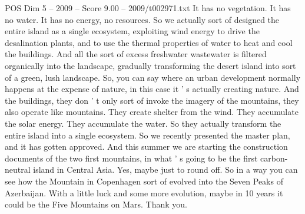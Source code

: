 \begin{textsample}{POS Dim 5 – 2009 – Score 9.00 – 2009/t002971.txt}
It has no vegetation.
It has no water.
It has no energy, no resources.
So we actually sort of designed the entire island as a single ecosystem, exploiting wind energy to drive the desalination plants, and to use the thermal properties of water to heat and cool the buildings.
And all the sort of excess freshwater wastewater is filtered organically into the landscape, gradually transforming the desert island into sort of a green, lush landscape.
So, you can say where an urban development normally happens at the expense of nature, in this case it ' s actually creating nature.
And the buildings, they don ' t only sort of invoke the imagery of the mountains, they also operate like mountains.
They create shelter from the wind.
They accumulate the solar energy.
They accumulate the water.
So they actually transform the entire island into a single ecosystem.
So we recently presented the master plan, and it has gotten approved.
And this summer we are starting the construction documents of the two first mountains, in what ' s going to be the first carbon-neutral island in Central Asia.
Yes, maybe just to round off.
So in a way you can see how the Mountain in Copenhagen sort of evolved into the Seven Peaks of Azerbaijan.
With a little luck and some more evolution, maybe in 10 years it could be the Five Mountains on Mars.
Thank you.

\end{textsample}
